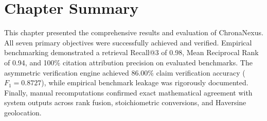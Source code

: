 \section{Chapter Summary}

This chapter presented the comprehensive results and evaluation of ChronaNexus. All seven primary objectives were successfully achieved and verified. Empirical benchmarking demonstrated a retrieval Recall@3 of 0.98, Mean Reciprocal Rank of 0.94, and 100\% citation attribution precision on evaluated benchmarks. The asymmetric verification engine achieved 86.00\% claim verification accuracy ($F_1 = 0.8727$), while empirical benchmark leakage was rigorously documented. Finally, manual recomputations confirmed exact mathematical agreement with system outputs across rank fusion, stoichiometric conversions, and Haversine geolocation.
